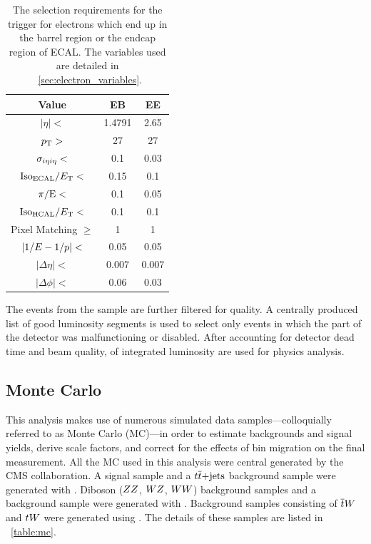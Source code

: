 \begin{table}[h]
\centering
\begin{center}
    \begin{tabular}{ | c | c c |} \hline
        Value                      & EB     & EE     \\ \hline
        $|\eta| <$                 & 1.4791 & 2.65   \\
        $p_{\mathrm{T}} >$                    & 27     & 27     \\
        $\sigma_{i \eta i \eta} <$         & 0.1    & 0.03   \\
        $\text{Iso}_{\text{ECAL}} / E_{\mathrm{T}} <$         & 0.15   & 0.1    \\
        $\pi/\mathrm{E} <$                & 0.1    & 0.05   \\
        $\text{Iso}_{\text{HCAL}} / E_{\mathrm{T}} <$         & 0.1    & 0.1    \\
        Pixel Matching $\ge$       & 1      & 1      \\
        $|1/E - 1/p| <$              & 0.05   & 0.05   \\
        $|\Delta \eta| <$          & 0.007  & 0.007  \\
        $|\Delta \phi| <$          & 0.06   & 0.03   \\ \hline
    \end{tabular}
\end{center}
\caption{
    The selection requirements for the \SingleElectronTrigger trigger for
    electrons which end up in the barrel region or the endcap region of ECAL.
    The variables used are detailed in \SEC~\ref{sec:electron_variables}.
}
\label{table:wp80}
\end{table}

The events from the \SingleElectron sample are further filtered for quality. A
centrally produced list of good luminosity segments is used to select only
events in which the part of the detector was malfunctioning or disabled. After
accounting for detector dead time and beam quality, \GoodLumiNumber of
integrated luminosity are used for physics analysis.

\subsection{Monte Carlo}

This analysis makes use of numerous simulated data samples---colloquially
referred to as Monte Carlo (MC)---in order to estimate backgrounds and signal
yields, derive scale factors, and correct for the effects of bin migration on
the final measurement. All the MC used in this analysis were central generated
by the CMS collaboration. A \DYtoll signal sample and a $t\overline{t}\text{+jets}$
background sample were generated with \MADGRAPH \cite{alwall2014}. Diboson
($ZZ$, $WZ$, $WW$) background samples and a \DYtotautau background sample
were generated with \PYTHIA \cite{sjostran2006}. Background samples consisting
of $\overline{t} W$ and $t W$ were generated using \POWHEG
\cite{nason2004}\cite{alioli2010}\cite{re2011}. The details of these samples
are listed in \TAB~\ref{table:mc}.


